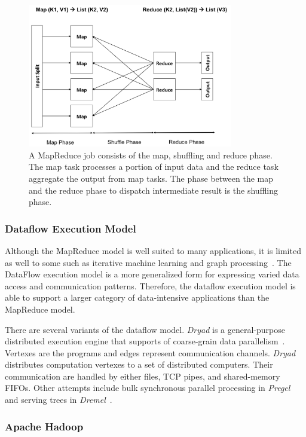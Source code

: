 \begin{figure}[!htbp]
    \centering
    \includegraphics[width=0.8\textwidth]{figures/mapreduce.png}
    \caption{A MapReduce job consists of the map, shuffling and reduce phase.  The map task processes a portion of input data and the reduce task aggregate the output from map tasks.  The phase between the map and the reduce phase to dispatch intermediate result is the shuffling phase.}
    \label{fig:mapreduce}
\end{figure}


\subsubsection*{Dataflow Execution Model}

Although the MapReduce model is well suited to many applications,
it is limited as well to some such as
iterative machine learning and graph processing~\cite{Babu2012}.
The DataFlow execution model is a more generalized form for expressing
varied data access and communication patterns.
Therefore, the dataflow execution model is able to support
a larger category of data-intensive applications
than the MapReduce model.

There are several variants of the dataflow model.
\emph{Dryad} is a general-purpose distributed execution engine
that supports of coarse-grain data parallelism~\cite{IsardM2007_Dyrad}.
Vertexes are the programs and edges represent communication channels.
\emph{Dryad} distributes computation vertexes to a set of distributed computers.
Their communication are handled by either
files, TCP pipes, and shared-memory FIFOs.
Other attempts include
bulk synchronous parallel processing in \emph{Pregel}~\cite{Malewicz2010} and
serving trees in \emph{Dremel}~\cite{Melnik2010}.


\subsubsection*{Apache Hadoop}


